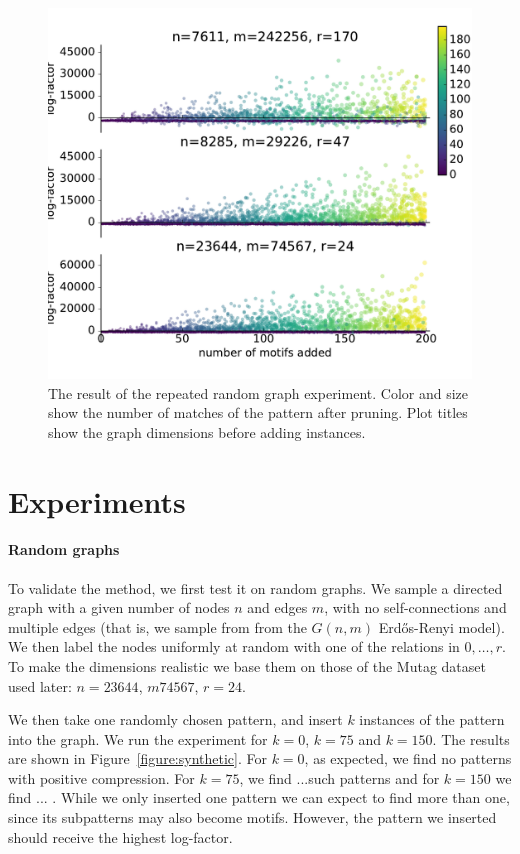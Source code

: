 \documentclass[letterpaper]{article} %
\begin{document}
 \begin{figure}[tb]
  \centering
    \includegraphics[width=\linewidth]{synthrep-plot.pdf}
    \caption{The result of the repeated random graph experiment. Color and size show the number of matches of the pattern after pruning. Plot titles show the graph dimensions before adding instances.}
    \label{figure:synthrep}
\end{figure}
\section{Experiments}

\paragraph{Random graphs} To validate the method, we first test it on random graphs. We sample a directed graph with a given number of nodes $n$ and edges $m$, with no self-connections and multiple edges (that is, we sample from from the $G(n, m)$ Erd\H{o}s-Renyi model). We then label the nodes uniformly at random with one of the relations in $0, \ldots, r$. To make the dimensions realistic we base them on those of the Mutag dataset used later: $n=23644$, $m74567$, $r=24$.

We then take one randomly chosen pattern, and insert $k$ instances of the pattern into the graph. We run the experiment for $k=0$, $k=75$ and $k=150$. The results are shown in Figure~\ref{figure:synthetic}. For $k=0$, as expected, we find no patterns with positive compression. For $k=75$, we find ...such patterns and for $k=150$ we find ... . While we only inserted one pattern we can expect to find more than one, since its subpatterns may also become motifs. However, the pattern we inserted should receive the highest log-factor.
\end{document}
